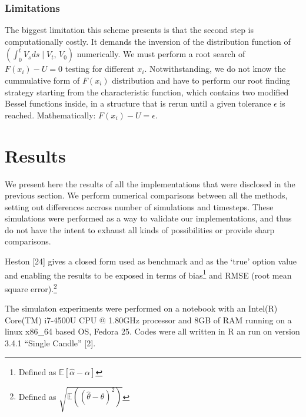 \documentclass[12pt,twoside]{reedthesis}
\theoremstyle{definition}
\theoremstyle{definition}
\theoremstyle{remark}
\begin{document}
  \subsection{Limitations}\label{limitations-1}
  
  The biggest limitation this scheme presents is that the second step is
  computationally costly. It demands the inversion of the distribution
  function of
  \(\left( \displaystyle \int_0^t V_sds \mid V_t, \, V_0 \right)\)
  numerically. We must perform a root search of \(F(x_i) - U = 0\) testing
  for different \(x_i\). Notwithstanding, we do not know the cummulative
  form of \(F(x_i)\) distribution and have to perform our root finding
  strategy starting from the characteristic function, which contains two
  modified Bessel functions inside, in a structure that is rerun until a
  given tolerance \(\epsilon\) is reached. Mathematically:
  \(F(x_i) - U = \epsilon\).
  
  \chapter{Results}\label{resultados}
  
  We present here the results of all the implementations that were
  disclosed in the previous section. We perform numerical comparisons
  between all the methods, setting out differences accross number of
  simulations and timesteps. These simulations were performed as a way to
  validate our implementations, and thus do not have the intent to exhaust
  all kinds of possibilities or provide sharp comparisons.
  
  Heston {[}24{]} gives a closed form used as benchmark and as the `true'
  option value and enabling the results to be exposed in terms of
  bias\footnote{Defined as
    \(\mathbb{E} \left[ \hat{\alpha} - \alpha \right]\)} and RMSE (root
  mean square error).\footnote{Defined as
    \(\sqrt{\mathbb{E}((\hat{\theta}-\theta)^2)}\)}
  
  The simulaton experiments were performed on a notebook with an Intel(R)
  Core(TM) i7-4500U CPU @ 1.80GHz processor and 8GB of RAM running on a
  linux x86\_64 based OS, Fedora 25. Codes were all written in R an run on
  version 3.4.1 ``Single Candle'' {[}2{]}.
  
\end{document}

